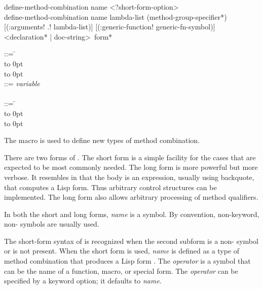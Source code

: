 \begin{defmac}
define-method-combination name <?short-form-option> \\
define-method-combination name lambda-list
    ({method-group-specifier}*)
    [(\!:arguments! \!.! lambda-list)]
    [(\!:generic-function! generic-fn-symbol)]
    <{declaration}* | doc-string>
    {\,form}*

\begin{tabbing}
 ::= \= \\
\>\hbox to 0pt{\hss\Mor~} \\
\>\hbox to 0pt{\hss\Mor~} \poptabs \\
 ::= \cd{(}\={\it variable\/}
     \\
\>\cd{)} \poptabs \\
 ::= \= \\
\>\hbox to 0pt{\hss\Mor~} \\
\>\hbox to 0pt{\hss\Mor~} \poptabs
\end{tabbing}
The macro  is used to define new types
of method combination.

There are two forms of .  The short
form is a simple facility for the cases that are expected
to be most commonly needed.  The long form is more powerful but more
verbose.  It resembles  in that the body is an
expression, usually using backquote, that computes a Lisp form.  Thus
arbitrary control structures can be implemented.  The long form also
allows arbitrary processing of method qualifiers.





In both the short and long forms, {\it name\/} is a symbol.  By convention,
non-keyword, non- symbols are usually used.

\medskip

The short-form syntax of  is recognized
when the second subform is a non- symbol or is not present.
When the short form is used, {\it name\/} is defined as a type of
method combination that produces a Lisp form .  The {\it operator\/} is a symbol
that can be the name of a function, macro, or special form.  The
{\it operator\/} can be specified by a keyword option; it defaults to {\it
name}.


\end{defmac}
